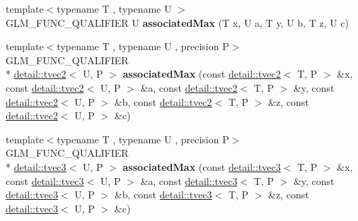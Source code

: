 \begin{DoxyCompactItemize}
\item 
\hypertarget{namespaceglm_a05414bdce7cb412a7417e04afe225095}{{\footnotesize template$<$typename T , typename U $>$ }\\G\-L\-M\-\_\-\-F\-U\-N\-C\-\_\-\-Q\-U\-A\-L\-I\-F\-I\-E\-R U {\bfseries associated\-Max} (T x, U a, T y, U b, T z, U c)}\label{namespaceglm_a05414bdce7cb412a7417e04afe225095}

\item 
\hypertarget{namespaceglm_a69390fa2f28e98f8a9f8186d8197dc27}{{\footnotesize template$<$typename T , typename U , precision P$>$ }\\G\-L\-M\-\_\-\-F\-U\-N\-C\-\_\-\-Q\-U\-A\-L\-I\-F\-I\-E\-R \\*
\hyperlink{structglm_1_1detail_1_1tvec2}{detail\-::tvec2}$<$ U, P $>$ {\bfseries associated\-Max} (const \hyperlink{structglm_1_1detail_1_1tvec2}{detail\-::tvec2}$<$ T, P $>$ \&x, const \hyperlink{structglm_1_1detail_1_1tvec2}{detail\-::tvec2}$<$ U, P $>$ \&a, const \hyperlink{structglm_1_1detail_1_1tvec2}{detail\-::tvec2}$<$ T, P $>$ \&y, const \hyperlink{structglm_1_1detail_1_1tvec2}{detail\-::tvec2}$<$ U, P $>$ \&b, const \hyperlink{structglm_1_1detail_1_1tvec2}{detail\-::tvec2}$<$ T, P $>$ \&z, const \hyperlink{structglm_1_1detail_1_1tvec2}{detail\-::tvec2}$<$ U, P $>$ \&c)}\label{namespaceglm_a69390fa2f28e98f8a9f8186d8197dc27}

\item 
\hypertarget{namespaceglm_af82b37be75e0c5604427cd0f2520cd5a}{{\footnotesize template$<$typename T , typename U , precision P$>$ }\\G\-L\-M\-\_\-\-F\-U\-N\-C\-\_\-\-Q\-U\-A\-L\-I\-F\-I\-E\-R \\*
\hyperlink{structglm_1_1detail_1_1tvec3}{detail\-::tvec3}$<$ U, P $>$ {\bfseries associated\-Max} (const \hyperlink{structglm_1_1detail_1_1tvec3}{detail\-::tvec3}$<$ T, P $>$ \&x, const \hyperlink{structglm_1_1detail_1_1tvec3}{detail\-::tvec3}$<$ U, P $>$ \&a, const \hyperlink{structglm_1_1detail_1_1tvec3}{detail\-::tvec3}$<$ T, P $>$ \&y, const \hyperlink{structglm_1_1detail_1_1tvec3}{detail\-::tvec3}$<$ U, P $>$ \&b, const \hyperlink{structglm_1_1detail_1_1tvec3}{detail\-::tvec3}$<$ T, P $>$ \&z, const \hyperlink{structglm_1_1detail_1_1tvec3}{detail\-::tvec3}$<$ U, P $>$ \&c)}\label{namespaceglm_af82b37be75e0c5604427cd0f2520cd5a}


\end{DoxyCompactItemize}
